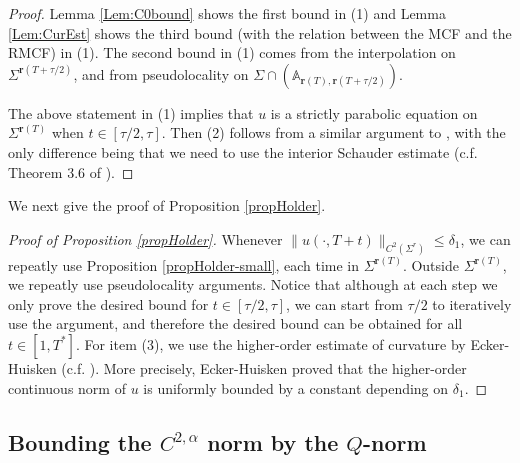 \documentclass[12pt]{amsart}
\numberwithin{equation}{section}
\numberwithin{equation}{section}
\newcommand{\al}{\alpha}
\begin{document}
	\begin{proof}
		Lemma \ref{Lem:C0bound} shows the first bound in (1) and Lemma \ref{Lem:CurEst} shows the third bound (with the relation between the MCF and the RMCF) in (1). The second bound in (1) comes from the interpolation on $\Sigma^{\mathbf{r}({T+\tau/2})}$, and from pseudolocality on $\Sigma\cap (\mathbb A_{\mathbf{r}({T}),\mathbf{r}({T+\tau/2})})$.
		
		The above statement in (1) implies that $u$ is a strictly parabolic equation on $\Sigma^{\mathbf{r}({T})}$ when $t\in[\tau/2,\tau]$. Then (2) follows from a similar argument to \cite[Proposition 3.28]{CM2}, with the only difference being that we need to use the interior Schauder estimate (c.f. Theorem 3.6 of \cite{CS}).
		
	\end{proof}
	We next give the proof of Proposition \ref{propHolder}. 
	\begin{proof}[Proof of Proposition \ref{propHolder}]
		Whenever $\|u(\cdot,T+t)\|_{C^2(\Sigma^r)}\leq \delta_1$, we can repeatly use Proposition \ref{propHolder-small}, each time in $\Sigma^{\mathbf{r}(T)}$. Outside $\Sigma^{\mathbf{r}(T)}$, we repeatly use pseudolocality arguments. Notice that although at each step we only prove the desired bound for $t\in[\tau/2,\tau]$, we can start from $\tau/2$ to iteratively use the argument, and therefore the desired bound can be obtained for all $t\in[1,T^*]$. For item (3), we use the higher-order estimate of curvature by Ecker-Huisken (c.f. \cite[Theorem 3.4]{EH}). More precisely, Ecker-Huisken proved that the higher-order continuous norm of $u$ is uniformly bounded by a constant depending on $\delta_1$.
	\end{proof}
	
	
	
	\subsection{Bounding the $C^{2,\al}$ norm by the $Q$-norm}\label{SSCQ}
	
\end{document}
